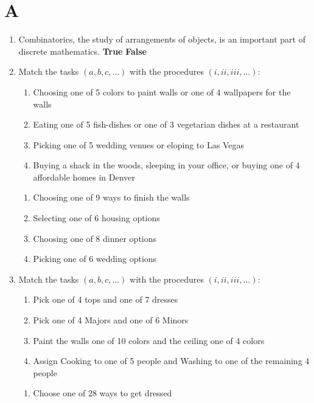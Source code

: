 \section*{A}
\begin{enumerate}
    \item 
    Combinatorics, the study of arrangements of objects, is an important part of discrete mathematics.
    \textbf{True} \hspace{1cm} \textbf{False}
    \item 
    Match the tasks $(a,b,c, \ldots)$ with the procedures $(i,ii,iii,\ldots)$:
    \begin{enumerate}
        \item Choosing one of 5 colors to paint walls or one of 4 wallpapers for the walls
        \item Eating one of 5 fish-dishes or one of 3 vegetarian dishes at a restaurant
        \item Picking one of 5 wedding venues or eloping to Las Vegas
        \item Buying a shack in the woods, sleeping in your office, or buying one of 4 affordable homes in Denver
    \end{enumerate}
    \begin{enumerate}[label=\roman*.]
        \item Choosing one of 9 ways to finish the walls
        \item Selecting one of 6 housing options
        \item Choosing one of 8 dinner options
        \item Picking one of 6 wedding options
    \end{enumerate}
    \item 
    Match the tasks $(a,b,c, \ldots)$ with the procedures $(i,ii,iii,\ldots)$:
    \begin{enumerate}
        \item Pick one of 4 tops and one of 7 dresses
        \item Pick one of 4 Majors and one of 6 Minors
        \item Paint the walls one of 10 colors and the ceiling one of 4 colors
        \item Assign Cooking to one of 5 people and Washing to one of the remaining 4 people
    \end{enumerate}
    \begin{enumerate}[label=\roman*.]
        \item Choose one of 28 ways to get dressed

\end{enumerate}
\end{enumerate}
